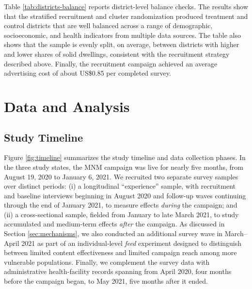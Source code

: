 \begin{table}[h!]
    \centering
    \caption{District characteristics by experimental condition} 
     \footnotesize
    
    \label{tab:districts-balance}
\end{table}

Table \ref{tab:districts-balance} reports district-level balance checks. The results show that the stratified recruitment and cluster randomization produced treatment and control districts that are well balanced across a range of demographic, socioeconomic, and health indicators from multiple data sources. The table also shows that the sample is evenly split, on average, between districts with higher and lower shares of solid dwellings, consistent with the recruitment strategy described above. Finally, the recruitment campaign achieved an average advertising cost of about US\$0.85 per completed survey.



\section{Data and Analysis}

\subsection{Study Timeline}\label{sec:timeline}

Figure \ref{fig:timeline} summarizes the study timeline and data collection phases. In the three study states, the MNM campaign was live for nearly five months, from August 19, 2020 to January 6, 2021. We recruited two separate survey samples over distinct periods: (i) a longitudinal “experience” sample, with recruitment and baseline interviews beginning in August 2020 and follow-up waves continuing through the end of January 2021, to measure effects \textit{during} the campaign; and (ii) a cross-sectional sample, fielded from January to late March 2021, to study accumulated and medium-term effects \textit{after} the campaign. As discussed in Section \ref{sec:mechanisms}, we also conducted an additional survey wave in March--April 2021 as part of an individual-level \textit{feed} experiment designed to distinguish between limited content effectiveness and limited campaign reach among more vulnerable populations. Finally, we complement the survey data with administrative health-facility records spanning from April 2020, four months before the campaign began, to May 2021, five months after it ended.

